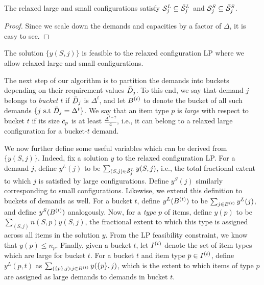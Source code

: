 \begin{claim}
The relaxed large and small configurations satisfy ${\cal S}^L_j \subseteq \bar{\cal S}^L_j$ and ${\cal S}^S_j \subseteq \bar{\cal S}^S_j$.
\end{claim}

\begin{proof}
Since we scale down the demands and capacities by a factor of $\Delta$, it is easy to see.
\end{proof}

\begin{corollary}
The solution $\{y(S,j)\}$ is feasible to the relaxed configuration LP where we allow relaxed large and small configurations.
\end{corollary}


\medskip {}
The next step of our algorithm is to partition the demands into buckets depending on their requirement values ${\bar D}_j$. To this end, we say that demand $j$ belongs to \emph{bucket $t$} if
${\bar D}_j$ is $\Delta^t$, and let $B^{(t)}$ to denote the bucket of all such demands $\{j \text{ s.t } {\bar D}_j = \Delta^t\}$. We say that an item type $p$ is \emph{large} with respect to bucket $t$ if its size ${\bar c}_p$ is at least $\frac{\Delta^{t-2}}{4}$, i.e., it can belong to a relaxed large configuration for a bucket-$t$ demand.  %

We now further define some useful variables which can be derived from $\{y(S,j)\}$. Indeed, fix a solution $y$ to the relaxed configuration LP. For a demand $j$, define $y^L(j)$ to be $\sum_{(S,j) \in \bar{\cal S}^L_j} y(S,j)$, i.e., the total fractional extent to which $j$ is satisfied by large configurations. Define $y^S(j)$ similarly corresponding to small configurations. Likewise, we extend this definition to buckets of demands as well. For a bucket $t$, define $y^L(B^{(t)})$ to be $\sum_{j \in B^{(t)}} y^L(j)$, and define $y^S(B^{(t)})$ analogously. Now, for a \emph{type $p$} of items, define $y(p)$ to be $\sum_{(S,j)} n(S,p) y(S,j)$, the fractional extent to which this type is assigned across all items in the solution $y$. From the LP feasibility constraint, we know that $y(p) \leq n_p$. Finally, given a bucket $t$, let $I^{(t)}$ denote the set of item types which are large for bucket $t$. For a bucket $t$ and item type $p \in I^{(t)}$, define $y^L(p,t)$ as $\sum_{(\{p\}, j): j \in B^{(t)}} y(\{p\}, j)$, which is the extent to which items of type $p$ are assigned as large demands to demands in bucket $t$.

